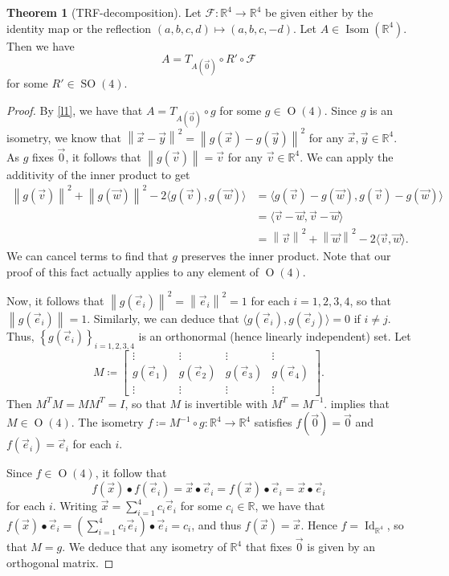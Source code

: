 \documentclass[10pt,letterpaper,cm]{nupset}
\theoremstyle{definition}
\theoremstyle{theorem}
\newtheorem{theorem}[definition]{Theorem}
\theoremstyle{remark}
\newcommand{\F}{\mathcal F}
\newcommand{\R}{\mathbb R}
\newcommand{\1}{\mathbf{1}}
\newcommand{\e}{\vec e}
\newcommand{\g}{\vec g}
\renewcommand{\v}{\vec v}
\newcommand{\w}{\vec w}
\newcommand{\x}{\vec x}
\newcommand{\y}{\vec y}
\newcommand{\0}{\vec {0}}
\DeclareMathOperator{\ORT}{O}
\DeclareMathOperator{\Id}{Id}
\DeclareMathOperator{\Isom}{Isom}
\DeclareMathOperator{\SO}{SO}
\begin{document}
\begin{theorem}[TRF-decomposition]\label{t1}
Let $\F:\R^4\to \R^4$ be given either by the identity map or the reflection $\left(a,b,c,d\right)\mapsto \left(a,b,c,{-d}\right)$. Let $A\in \Isom(\R^4)$. Then we have $$A=T_{A(\0)}\circ R' \circ  \F$$ for some $R'\in \SO(4)$.
\end{theorem}
\begin{proof}
 By \cref{l1}, we have that $A=T_{A(\0)}\circ g$ for some $g\in \ORT(4)$. Since $g$ is an isometry, we know that $ \left\lVert{\x-\y}\right\rVert^2= \left\lVert{g(\x)-g(\y)}\right\rVert^2$ for any $\x, \y\in \R^4$. As $g$ fixes $\0$, it follows that $ \left\lVert{g(\v)}\right\rVert=\v$ for any $\v\in \R^4$.
We can apply the additivity of the inner product to get  
\begin{align*}
 \left\lVert{g(\v)}\right\rVert^2+ \left\lVert{g(\w)}\right\rVert^2-2\langle g(\v), g(\w)\rangle & =\langle g(\v)-g(\w), g(\v)-g(\w)\rangle 
\\ & =\langle \v-\w, \v-\w\rangle
\\ & = \left\lVert{\v}\right\rVert^2+ \left\lVert{\w}\right\rVert^2-2\langle \v, \w\rangle.
\end{align*}  We can cancel terms to find that $g$ preserves the inner product. Note that our proof of this fact actually applies to any element of $\ORT(4)$.

Now, it follows that $ \left\lVert{g(\e_i)}\right\rVert^2= \left\lVert{\e_i}\right\rVert^2=1$ for each $i=1,2,3,4$, so that $ \left\lVert{g(\e_i)}\right\rVert=1$. Similarly,  we can deduce that  $\langle g(\e_i),g(\e_j)\rangle = 0$ if $i\ne j$. Thus, $\left\{g(\e_i)\right\}_{i=1,2,3,4}$ is an orthonormal (hence linearly independent) set.  Let $$M\coloneqq \begin{bmatrix} \vdots & \vdots & \vdots & \vdots \\g(\e_1) & g(\e_2) & g(\e_3) & g(\e_4) \\ \vdots & \vdots & \vdots & \vdots\end{bmatrix}.$$ Then $M^TM=MM^T=I$, so that $M$ is invertible with $M^T=M^{-1}$.   implies that $M\in \ORT(4)$. The isometry $f\coloneqq M^{-1}\circ g:\R^4 \to \R^4$ satisfies $f(\0)=\0$ and $f(\e_i)=\e_i$ for each $i$. 

Since $f\in \ORT(4)$, it follow that $$f(\x)\bullet f(\e_i) = \x \bullet \e_i=f(\x)\bullet \e_i=\x\bullet \e_i$$ for each $i$. Writing $\x=\sum_{i=1}^4 c_i\e_i$ for some $c_i\in \R$, we have that $f(\x)\bullet \e_i =\left(\sum_{i=1}^4 c_i\e_i\right) \bullet \e_i=c_i$, and thus $f(\x)=\x$. Hence $f=\Id_{\R^4}$, so that $M=g$.  We deduce that any isometry of $\R^4$ that fixes $\0$ is given by an orthogonal matrix.


\end{proof}
\end{document}
